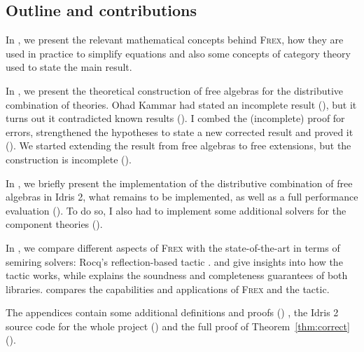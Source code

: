 \subsection{Outline and contributions}

In , we present the relevant mathematical concepts behind \textsc{Frex}, how they are used in practice to simplify equations and also some concepts of category theory used to state the main result.

In , we present the theoretical construction of free algebras for the distributive combination of theories. Ohad Kammar had stated an incomplete result (), but it turns out it contradicted known results (). I combed the (incomplete) proof for errors, strengthened the hypotheses to state a new corrected result and proved it (). We started extending the result from free algebras to free extensions, but the construction is incomplete ().

In , we briefly present the implementation of the distributive combination of free algebras in Idris 2, what remains to be implemented, as well as a full performance evaluation (). To do so, I also had to implement some additional solvers for the component theories ().

In , we compare different aspects of \textsc{Frex} with the state-of-the-art in terms of semiring solvers: Rocq's reflection-based \ring tactic \parencite{agda_solver}.  and  give insights into how the \ring tactic works, while  explains the soundness and completeness guarantees of both libraries.  compares the capabilities and applications of \textsc{Frex} and the \ring tactic.

The appendices contain some additional definitions and proofs ()
, the Idris 2 source code for the whole project () and the full proof of Theorem~\ref{thm:correct} ().

